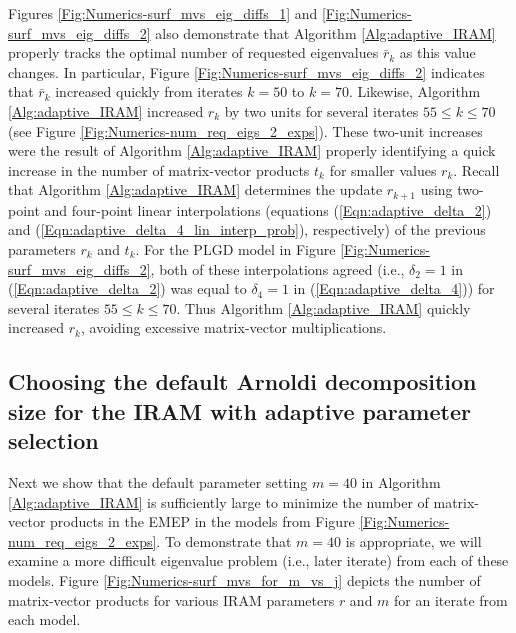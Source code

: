 Figures \ref{Fig:Numerics-surf_mvs_eig_diffs_1} and \ref{Fig:Numerics-surf_mvs_eig_diffs_2} also demonstrate that Algorithm \ref{Alg:adaptive_IRAM} properly tracks the optimal number of requested eigenvalues $\bar{r}_k$ as this value changes.
In particular, Figure \ref{Fig:Numerics-surf_mvs_eig_diffs_2} indicates that $\bar{r}_k$ increased quickly from iterates $k = 50$ to $k = 70$.
Likewise, Algorithm \ref{Alg:adaptive_IRAM} increased $r_k$ by two units for several iterates $55 \leq k \leq 70$ (see Figure \ref{Fig:Numerics-num_req_eigs_2_exps}).
These two-unit increases were the result of Algorithm \ref{Alg:adaptive_IRAM} properly identifying a quick increase in the number of matrix-vector products $t_k$ for smaller values $r_k$.
Recall that Algorithm \ref{Alg:adaptive_IRAM} determines the update $r_{k+1}$ using two-point and four-point linear interpolations (equations (\ref{Eqn:adaptive_delta_2}) and (\ref{Eqn:adaptive_delta_4_lin_interp_prob}), respectively) of the previous parameters $r_k$ and $t_k$.
For the PLGD model in Figure \ref{Fig:Numerics-surf_mvs_eig_diffs_2}, both of these interpolations agreed (i.e., $\delta_2=1$ in (\ref{Eqn:adaptive_delta_2}) was equal to $\delta_4=1$ in (\ref{Eqn:adaptive_delta_4})) for several iterates $55 \leq k \leq 70$.
Thus Algorithm \ref{Alg:adaptive_IRAM} quickly increased $r_k$, avoiding excessive matrix-vector multiplications.







\subsection{Choosing the default Arnoldi decomposition size for the IRAM with adaptive parameter selection}		\label{Subsubsec:Numerics-default_Arnoldi_decomp_size}



Next we show that the default parameter setting $m = 40$ in Algorithm \ref{Alg:adaptive_IRAM} is sufficiently large to minimize the number of matrix-vector products in the EMEP in the models from Figure \ref{Fig:Numerics-num_req_eigs_2_exps}.
To demonstrate that $m=40$ is appropriate, we will examine a more difficult eigenvalue problem (i.e., later iterate) from each of these models.
Figure \ref{Fig:Numerics-surf_mvs_for_m_vs_j} depicts the number of matrix-vector products for various IRAM parameters $r$ and $m$ for an iterate from each model.



